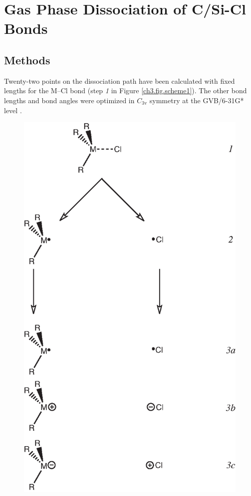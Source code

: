 \section{\label{ch3.sec.gasphase}Gas Phase Dissociation of C/Si-Cl Bonds}

\subsection{Methods}

Twenty-two points on the dissociation path have been calculated with fixed lengths for the \mbox{M--Cl} bond (step \textit{1} in Figure \ref{ch3.fig.scheme1}). The other bond lengths and bond angles were optimized in $C_\mathrm{3v}$ symmetry at the \mbox{GVB/6-31G*} level \cite{gvb1,gvb2,gvb3,gvb4}.
\begin{figure}[ht]
\begin{center}
\includegraphics{dissociation/figures/scheme1.eps}

\end{center}
\end{figure}
